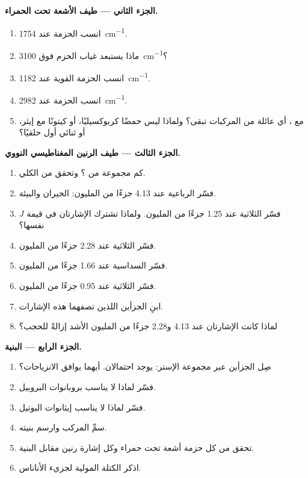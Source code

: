 \begin{problem}
\medskip
\noindent\textbf{الجزء الثاني --- طيف الأشعة تحت الحمراء.}
\begin{enumerate}[resume]
  \item انسب الحزمة عند \qty{1754}{cm^{-1}}.
  \item ماذا يستبعد غياب الحزم فوق \qty{3100}{cm^{-1}}؟
  \item انسب الحزمة القوية عند \qty{1182}{cm^{-1}}.
  \item انسب الحزمة عند \qty{2982}{cm^{-1}}.
  \item مع ، أي عائلة من المركبات
        تبقى؟ ولماذا ليس حمضًا كربوكسيليًا، أو كيتونًا مع إيثر، أو
        ثنائي أول حلقيًا؟
\end{enumerate}

\medskip
\noindent\textbf{الجزء الثالث --- طيف الرنين المغناطيسي النووي.}
\begin{enumerate}[resume]
  \item كم مجموعة من ؟ وتحقق من  الكلي.
  \item فسّر الرباعية عند 4.13 جزءًا من المليون: الجيران والبيئة.
  \item فسّر الثلاثية عند 1.25 جزءًا من المليون. ولماذا تشترك الإشارتان في قيمة
        $J$ نفسها؟
  \item فسّر الثلاثية عند 2.28 جزءًا من المليون.
  \item فسّر السداسية عند 1.66 جزءًا من المليون.
  \item فسّر الثلاثية عند 0.95 جزءًا من المليون.
  \item ابنِ الجزأين اللذين تصفهما هذه الإشارات.
  \item لماذا كانت الإشارتان عند 4.13 و2.28 جزءًا من المليون الأشد إزالةً للحجب؟
\end{enumerate}

\medskip
\noindent\textbf{الجزء الرابع --- البنية.}
\begin{enumerate}[resume]
  \item صِل الجزأين عبر مجموعة الإستر: يوجد احتمالان.
        أيهما يوافق الانزياحات؟
  \item فسّر لماذا لا يناسب بروبانوات البروبيل.
  \item فسّر لماذا لا يناسب إيثانوات البوتيل.
  \item سمِّ المركب وارسم بنيته.
  \item تحقق من كل حزمة أشعة تحت حمراء وكل إشارة رنين مقابل البنية.
  \item اذكر الكتلة المولية لجزيء الأناناس.
\end{enumerate}
\end{problem}
